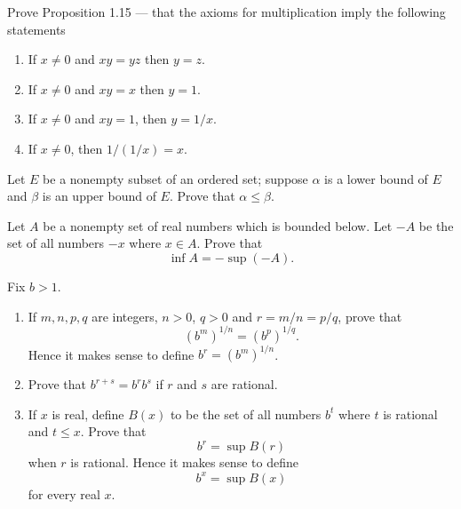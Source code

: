 \documentclass[12 pt, letterpaper]{hmcpset}
\begin{document}
\pagebreak

\begin{problem}[3.]
	Prove Proposition 1.15 --- that the axioms for multiplication imply the following statements
	\begin{enumerate}
		\item If $x \neq 0$ and $xy = yz$ then $y = z$.
		\item If $x \neq 0$ and $xy = x$ then $y = 1$.
		\item If $x \neq 0$ and $xy = 1$, then $y = 1/x$.
		\item If $x \neq 0$, then $1/(1/x) = x$.
	\end{enumerate}
\end{problem}

\pagebreak

\begin{problem}[4.]
	Let $E$ be a nonempty subset of an ordered set; suppose $\alpha$ is a lower bound of $E$ and $\beta$ is an upper bound of $E$. Prove that $\alpha \le \beta$.
\end{problem}

\pagebreak

\begin{problem}[5.]
	Let $A$ be a nonempty set of real numbers which is bounded below. Let $-A$ be the set of all numbers $-x$ where $x \in A$. Prove that
	\[
		\inf A = - \sup (-A).
	\]
\end{problem}

\pagebreak

\begin{problem}[6.]
	Fix $b > 1$.
	\begin{enumerate}
		\item If $m, n, p, q$ are integers,  $n > 0$, $q > 0$ and $r = m/n = p/q$, prove that
			\[
				(b^{m})^{1/n} = (b^{p})^{1/q}.
			\]
			Hence it makes sense to define $b^{r} = (b^{m})^{1/n}$.
		\item Prove that $b^{r + s} = b^{r}b^{s}$ if $r$ and $s$ are rational.
		\item If $x$ is real, define $B(x)$ to be the set of all numbers $b^{t}$ where $t$ is rational and $t \le x$. Prove that
			\[
				b^{r} = \sup B(r)
			\]
			when $r$ is rational. Hence it makes sense to define
			\[
				b^{x} = \sup B(x)
			\]
			for every real $x$.
	\end{enumerate}
\end{problem}

\pagebreak
\end{document}
